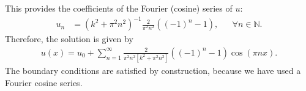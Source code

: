 \documentclass[11pt]{article}
\begin{document}
\begin{solution}
\begin{itemize}
        This provides the coefficients of the Fourier (cosine) series of $u$:
        \begin{align*}
            u_n &= \left( k^2 + \pi^2 n^2 \right)^{-1} \frac{2}{\pi^2 n^2}\left( (-1)^n - 1 \right), & & \forall n \in \mathbb{N}.
        \end{align*}
        Therefore, the solution is given by 
        \begin{align*}
            u(x) = u_0 + \sum_{n=1}^{\infty} \frac{2}{\pi^2 n^2 \left[k^2 + \pi^2 n^2 \right]}\left( (-1)^n - 1 \right) \cos(\pi n x).
        \end{align*}
        The boundary conditions are satisfied by construction, because we have used a Fourier cosine series. 
    \end{itemize}
\end{solution}




















\end{document}
